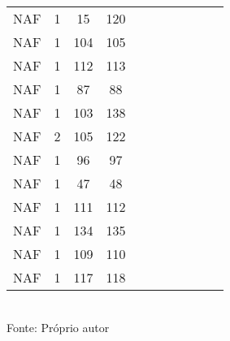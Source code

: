 \begin{table}[H]
{\begin{tabular}{ccccccccccc}
NAF & 1 & 15 & 120 &  &  &  &  &  &  &  \\
NAF & 1 & 104 & 105 &  &  &  &  &  &  &  \\
NAF & 1 & 112 & 113 &  &  &  &  &  &  &  \\
NAF & 1 & 87 & 88 &  &  &  &  &  &  &  \\
NAF & 1 & 103 & 138 &  &  &  &  &  &  &  \\
NAF & 2 & 105 & 122 &  &  &  &  &  &  &  \\
NAF & 1 & 96 & 97 &  &  &  &  &  &  &  \\
NAF & 1 & 47 & 48 &  &  &  &  &  &  &  \\
NAF & 1 & 111 & 112 &  &  &  &  &  &  &  \\
NAF & 1 & 134 & 135 &  &  &  &  &  &  &  \\
NAF & 1 & 109 & 110 &  &  &  &  &  &  &  \\
NAF & 1 & 117 & 118 &  &  &  &  &  &  &  \\
\bottomrule
\end{tabular}}
\\Fonte: Próprio autor
\end{table}


